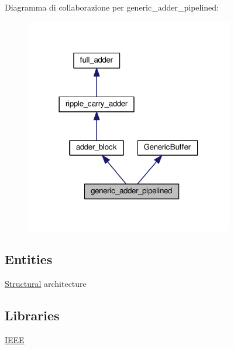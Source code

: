 Diagramma di collaborazione per generic\+\_\+adder\+\_\+pipelined\+:\nopagebreak
\begin{figure}[H]
\begin{center}
\leavevmode
\includegraphics[width=258pt]{classgeneric__adder__pipelined__coll__graph}
\end{center}
\end{figure}
\subsection*{Entities}
\begin{DoxyCompactItemize}
\item 
\hyperlink{classgeneric__adder__pipelined_1_1_structural}{Structural} architecture
\end{DoxyCompactItemize}
\subsection*{Libraries}
 \begin{DoxyCompactItemize}
\item 
\hypertarget{classgeneric__adder__pipelined_gae4f03c286607f3181e16b9aa12d0c6d4}{\hyperlink{group___majority_voter_gae4f03c286607f3181e16b9aa12d0c6d4}{I\+E\+E\+E} }\label{classgeneric__adder__pipelined_gae4f03c286607f3181e16b9aa12d0c6d4}

\end{DoxyCompactItemize}
